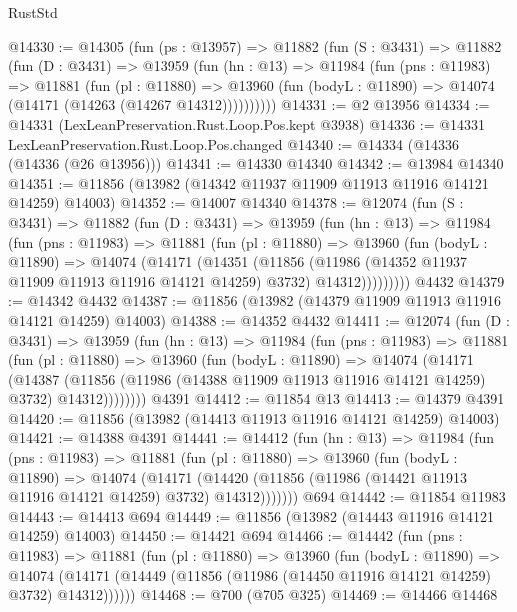 \begin{lexlean}{RustStd}
\begin{coremodule}
@14330 := @14305
    (fun (ps : @13957) =>
    @11882
      (fun (S : @3431) =>
      @11882
        (fun (D : @3431) =>
        @13959
          (fun (hn : @13) =>
          @11984
            (fun (pns : @11983) =>
            @11881
              (fun (pl : @11880) =>
              @13960 (fun (bodyL : @11890) => @14074 (@14171 (@14263 (@14267 @14312))))))))))
@14331 := @2 @13956
@14334 := @14331 (LexLeanPreservation.Rust.Loop.Pos.kept @3938)
@14336 := @14331 LexLeanPreservation.Rust.Loop.Pos.changed
@14340 := @14334 (@14336 (@14336 (@26 @13956)))
@14341 := @14330 @14340
@14342 := @13984 @14340
@14351 := @11856 (@13982 (@14342 @11937 @11909 @11913 @11916 @14121 @14259) @14003)
@14352 := @14007 @14340
@14378 := @12074
    (fun (S : @3431) =>
    @11882
      (fun (D : @3431) =>
      @13959
        (fun (hn : @13) =>
        @11984
          (fun (pns : @11983) =>
          @11881
            (fun (pl : @11880) =>
            @13960
              (fun (bodyL : @11890) =>
              @14074
                (@14171
                  (@14351
                    (@11856
                      (@11986 (@14352 @11937 @11909 @11913 @11916 @14121 @14259) @3732)
                      @14312)))))))))
    @4432
@14379 := @14342 @4432
@14387 := @11856 (@13982 (@14379 @11909 @11913 @11916 @14121 @14259) @14003)
@14388 := @14352 @4432
@14411 := @12074
    (fun (D : @3431) =>
    @13959
      (fun (hn : @13) =>
      @11984
        (fun (pns : @11983) =>
        @11881
          (fun (pl : @11880) =>
          @13960
            (fun (bodyL : @11890) =>
            @14074
              (@14171
                (@14387
                  (@11856 (@11986 (@14388 @11909 @11913 @11916 @14121 @14259) @3732) @14312))))))))
    @4391
@14412 := @11854 @13
@14413 := @14379 @4391
@14420 := @11856 (@13982 (@14413 @11913 @11916 @14121 @14259) @14003)
@14421 := @14388 @4391
@14441 := @14412
    (fun (hn : @13) =>
    @11984
      (fun (pns : @11983) =>
      @11881
        (fun (pl : @11880) =>
        @13960
          (fun (bodyL : @11890) =>
          @14074
            (@14171
              (@14420 (@11856 (@11986 (@14421 @11913 @11916 @14121 @14259) @3732) @14312)))))))
    @694
@14442 := @11854 @11983
@14443 := @14413 @694
@14449 := @11856 (@13982 (@14443 @11916 @14121 @14259) @14003)
@14450 := @14421 @694
@14466 := @14442
    (fun (pns : @11983) =>
    @11881
      (fun (pl : @11880) =>
      @13960
        (fun (bodyL : @11890) =>
        @14074 (@14171 (@14449 (@11856 (@11986 (@14450 @11916 @14121 @14259) @3732) @14312))))))
@14468 := @700 (@705 @325)
@14469 := @14466 @14468

\end{coremodule}
\end{lexlean}
